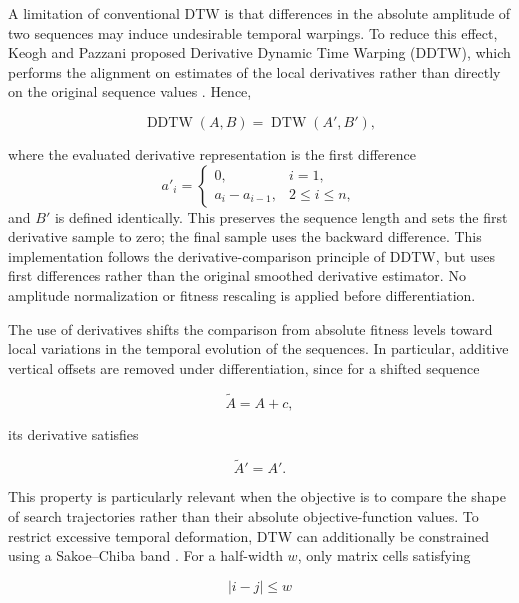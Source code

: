\documentclass[journal,article,submit,moreauthors]{Definitions/mdpi}
\begin{document}
A limitation of conventional DTW is that differences in the absolute
amplitude of two sequences may induce undesirable temporal warpings. To
reduce this effect, Keogh and Pazzani proposed Derivative Dynamic Time
Warping (DDTW), which performs the alignment on estimates of the local
derivatives rather than directly on the original sequence values
\cite{keogh2001derivative}. Hence,

\begin{equation}
\operatorname{DDTW}(A,B)
=
\operatorname{DTW}(A',B'),
\end{equation}

where the evaluated derivative representation is the first difference
\begin{equation}
a'_i=\begin{cases}
0, & i=1,\\
a_i-a_{i-1}, & 2\leq i\leq n,
\end{cases}
\label{eq:first_difference}
\end{equation}
and $B'$ is defined identically. This preserves the sequence length and
sets the first derivative sample to zero; the final sample uses the backward
difference. This implementation follows the derivative-comparison principle
of DDTW, but uses first differences rather than the original smoothed
derivative estimator. No amplitude normalization or fitness rescaling is
applied before differentiation.

The use of derivatives shifts the comparison from absolute fitness levels
toward local variations in the temporal evolution of the sequences. In
particular, additive vertical offsets are removed under differentiation,
since for a shifted sequence

\begin{equation}
\widetilde{A}=A+c,
\end{equation}

its derivative satisfies

\begin{equation}
\widetilde{A}'=A'.
\end{equation}

This property is particularly relevant when the objective is to compare the
shape of search trajectories rather than their absolute objective-function
values. To restrict excessive temporal deformation, DTW can additionally be
constrained using a Sakoe--Chiba band \cite{sakoe1978dynamic}. For a
half-width $w$, only matrix cells satisfying

\begin{equation}
|i-j|\leq w
\end{equation}
\end{document}
